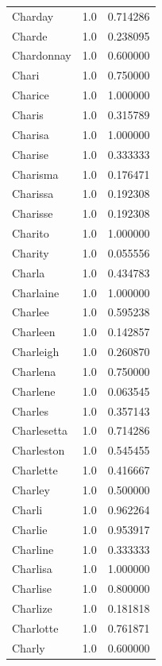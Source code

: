 \documentclass[
  letterpaper,
  DIV=11,
  numbers=noendperiod]{scrreprt}
\begin{document}
\begin{tabular}{lrr}
Charday         &   1.0 &   0.714286 \\
Charde          &   1.0 &   0.238095 \\
Chardonnay      &   1.0 &   0.600000 \\
Chari           &   1.0 &   0.750000 \\
Charice         &   1.0 &   1.000000 \\
Charis          &   1.0 &   0.315789 \\
Charisa         &   1.0 &   1.000000 \\
Charise         &   1.0 &   0.333333 \\
Charisma        &   1.0 &   0.176471 \\
Charissa        &   1.0 &   0.192308 \\
Charisse        &   1.0 &   0.192308 \\
Charito         &   1.0 &   1.000000 \\
Charity         &   1.0 &   0.055556 \\
Charla          &   1.0 &   0.434783 \\
Charlaine       &   1.0 &   1.000000 \\
Charlee         &   1.0 &   0.595238 \\
Charleen        &   1.0 &   0.142857 \\
Charleigh       &   1.0 &   0.260870 \\
Charlena        &   1.0 &   0.750000 \\
Charlene        &   1.0 &   0.063545 \\
Charles         &   1.0 &   0.357143 \\
Charlesetta     &   1.0 &   0.714286 \\
Charleston      &   1.0 &   0.545455 \\
Charlette       &   1.0 &   0.416667 \\
Charley         &   1.0 &   0.500000 \\
Charli          &   1.0 &   0.962264 \\
Charlie         &   1.0 &   0.953917 \\
Charline        &   1.0 &   0.333333 \\
Charlisa        &   1.0 &   1.000000 \\
Charlise        &   1.0 &   0.800000 \\
Charlize        &   1.0 &   0.181818 \\
Charlotte       &   1.0 &   0.761871 \\
Charly          &   1.0 &   0.600000 \\

\end{tabular}
\end{document}
